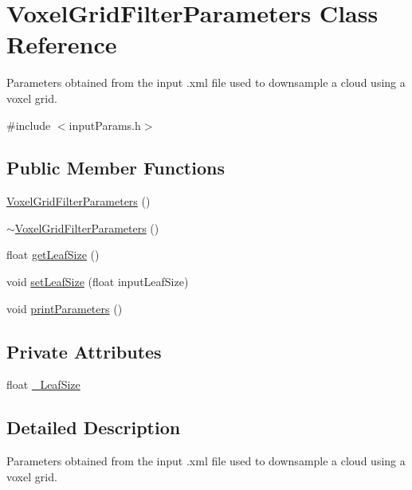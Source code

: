 \hypertarget{classVoxelGridFilterParameters}{\section{Voxel\-Grid\-Filter\-Parameters Class Reference}
\label{classVoxelGridFilterParameters}
}


Parameters obtained from the input .xml file used to downsample a cloud using a voxel grid.  




{\ttfamily \#include $<$input\-Params.\-h$>$}

\subsection*{Public Member Functions}
\begin{DoxyCompactItemize}
\item 
\hyperlink{classVoxelGridFilterParameters_a1bd96568004e3a8987162b6ef1f38fa7}{Voxel\-Grid\-Filter\-Parameters} ()
\item 
\hyperlink{classVoxelGridFilterParameters_afb712496c359e566359b8b20917ffdc8}{$\sim$\-Voxel\-Grid\-Filter\-Parameters} ()
\item 
float \hyperlink{classVoxelGridFilterParameters_a879ee1fa90e4d63c2df33331296f6454}{get\-Leaf\-Size} ()
\item 
void \hyperlink{classVoxelGridFilterParameters_a067420006790541c247c076aec7ba255}{set\-Leaf\-Size} (float input\-Leaf\-Size)
\item 
void \hyperlink{classVoxelGridFilterParameters_ad2cb9fea0904452d39308da271046c24}{print\-Parameters} ()
\end{DoxyCompactItemize}
\subsection*{Private Attributes}
\begin{DoxyCompactItemize}
\item 
float \hyperlink{classVoxelGridFilterParameters_a31175242a7e2750e44189d9e2e4b8d87}{\-\_\-\-Leaf\-Size}
\end{DoxyCompactItemize}


\subsection{Detailed Description}
Parameters obtained from the input .xml file used to downsample a cloud using a voxel grid. 

